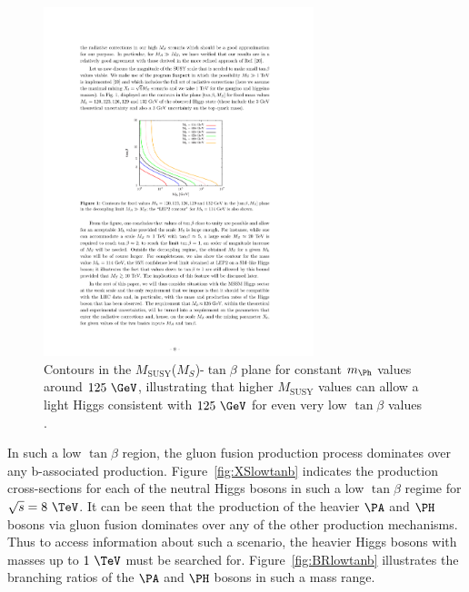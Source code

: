 \begin{figure}[htbp]
   \includegraphics[width=0.7\textwidth]{plots/theory/MSUSY_tanb.pdf}
\caption[Contours in the $M_{\text{SUSY}}$-$\tan\beta$ plane for
constant $m_{\Ph}$ values around $125~\GeV$.]{Contours in the $M_{\text{SUSY}}$($M_{S}$)-$\tan\beta$ plane for
constant $m_{\Ph}$ values around $125~\GeV$, illustrating that higher
$M_{\text{SUSY}}$ values can allow a light Higgs consistent with $125~\GeV$ for
even very low $\tan\beta$ values \cite{Djouadi:2013vqa}.}
\label{fig:MSUSYcontours}
\end{figure}

In such a low $\tan\beta$ region, the gluon fusion production process dominates
over any b-associated production. Figure~\ref{fig:XSlowtanb} indicates the
production cross-sections for each of the neutral Higgs bosons in such a low
$\tan\beta$ regime for $\sqrt{s}=8~\TeV$. It can be seen that the production of
the heavier $\PA$ and $\PH$ bosons via gluon fusion dominates over any of the
other production mechanisms. Thus to access information about such a scenario,
the heavier Higgs bosons with masses up to $1~\TeV$ must be searched for.
Figure~\ref{fig:BRlowtanb} illustrates the branching ratios of the $\PA$ and
$\PH$ bosons in such a mass range. 

